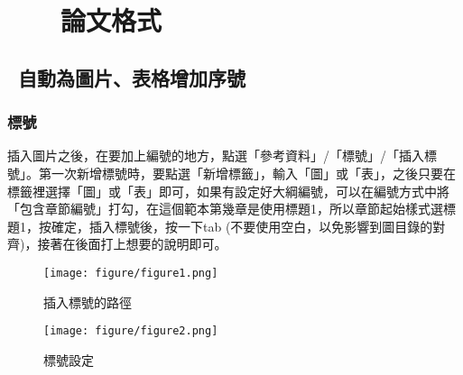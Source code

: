 
\chapter{~~~ 論文格式}
\label{ch:ch1}

\section{~自動為圖片、表格增加序號 }
\label{se:se1}
\subsection{標號}
插入圖片之後，在要加上編號的地方，點選「參考資料」/「標號」/「插入標號」。第一次新增標號時，要點選「新增標籤」，輸入「圖」或「表」，之後只要在標籤裡選擇「圖」或「表」即可，如果有設定好大綱編號，可以在編號方式中將「包含章節編號」打勾，在這個範本第幾章是使用標題1，所以章節起始樣式選標題1，按確定，插入標號後，按一下tab (不要使用空白，以免影響到圖目錄的對齊)，接著在後面打上想要的說明即可。
\begin{figure}
 \centering
 \texttt{[image: figure/figure1.png]} %
 \caption{插入標號的路徑} %
 \label{img} 
\end{figure}
\begin{figure}
 \centering %
 \texttt{[image: figure/figure2.png]}
\caption{標號設定}
\end{figure}
\clearpage
